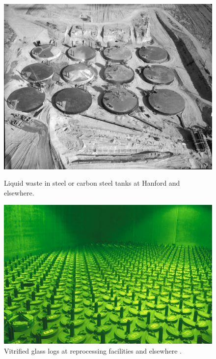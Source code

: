 

  \begin{figure}[htbp!]
    \begin{center}
    \begin{minipage}[t]{0.45\textwidth}
      \includegraphics[height=0.4\textheight]{./images/tanks.eps}
        \caption{Liquid waste in steel or carbon steel tanks at Hanford and 
          elsewhere\cite{doe_underground_????}.}
        \label{fig:tanks}
    \end{minipage}
    \hspace{0.01\textwidth}
    \begin{minipage}[t]{0.45\textwidth}
      \includegraphics[height=0.4\textheight]{./images/logs.eps}
        \caption{Vitrified glass logs at reprocessing facilities and elsewhere 
          \cite{essick_photographing_2012}.}
        \label{fig:logs}
    \end{minipage}
    \end{center}
  \end{figure}
